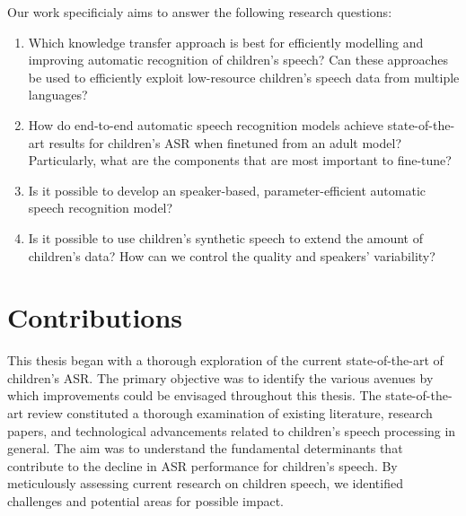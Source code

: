 Our work specificialy aims to answer the following research questions:
\begin{enumerate}
\item Which knowledge transfer approach is best for efficiently modelling and improving automatic recognition of children's speech? Can these approaches be used to efficiently exploit low-resource children's speech data from multiple languages?
\item  How do end-to-end automatic speech recognition models achieve state-of-the-art results for children's ASR when finetuned from an adult model? Particularly, what are the components that are most important to fine-tune?
\item Is it possible to develop an speaker-based, parameter-efficient automatic speech recognition model?
\item Is it possible to use children's synthetic speech to extend the amount of children's data? How can we control the quality and speakers’ variability?
\end{enumerate}

\section{Contributions}
This thesis began with a thorough exploration of the current state-of-the-art of children's ASR. The primary objective was to identify the various avenues by which improvements could be envisaged throughout this thesis. The state-of-the-art review constituted a thorough examination of existing literature, research papers, and technological advancements related to children's speech processing in general. The aim was to understand the fundamental determinants that contribute to the decline in ASR performance for children's speech. By meticulously assessing current research on children speech, we identified challenges and potential areas for possible impact.

